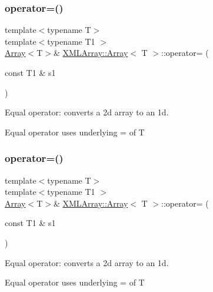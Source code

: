 \subsubsection{\texorpdfstring{operator=()}{operator=()}\hspace{0.1cm}{\footnotesize\ttfamily [4/9]}}
{\footnotesize\ttfamily template$<$typename T$>$ \\
template$<$typename T1 $>$ \\
\mbox{\hyperlink{classXMLArray_1_1Array}{Array}}$<$T$>$\& \mbox{\hyperlink{classXMLArray_1_1Array}{X\+M\+L\+Array\+::\+Array}}$<$ T $>$\+::operator= (\begin{DoxyParamCaption}\item[{const T1 \&}]{s1 }\end{DoxyParamCaption})\hspace{0.3cm}{\ttfamily [inline]}}



Equal operator\+: converts a 2d array to an 1d. 

Equal operator uses underlying = of T \mbox{\label{classXMLArray_1_1Array_a3051ecb95c6d07f9ad80e72a2fd50c61}} 
\subsubsection{\texorpdfstring{operator=()}{operator=()}\hspace{0.1cm}{\footnotesize\ttfamily [5/9]}}
{\footnotesize\ttfamily template$<$typename T$>$ \\
template$<$typename T1 $>$ \\
\mbox{\hyperlink{classXMLArray_1_1Array}{Array}}$<$T$>$\& \mbox{\hyperlink{classXMLArray_1_1Array}{X\+M\+L\+Array\+::\+Array}}$<$ T $>$\+::operator= (\begin{DoxyParamCaption}\item[{const T1 \&}]{s1 }\end{DoxyParamCaption})\hspace{0.3cm}{\ttfamily [inline]}}



Equal operator\+: converts a 2d array to an 1d. 

Equal operator uses underlying = of T \mbox{\label{classXMLArray_1_1Array_a3051ecb95c6d07f9ad80e72a2fd50c61}} 
